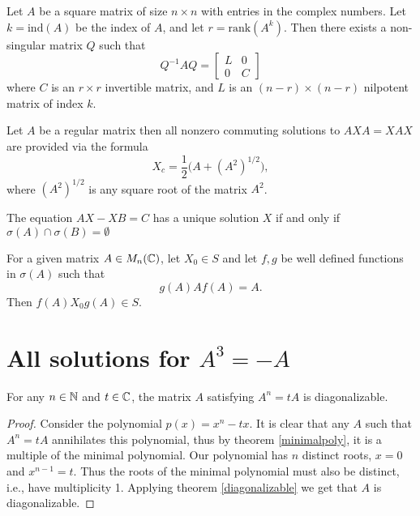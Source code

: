 \documentclass{article}
\begin{document}
\begin{theorem} \label{core-nilpotent}
Let $A$ be a square matrix of size $n \times n$ with entries in the complex numbers. Let $k = \mathrm{ind}(A)$ be the index of $A$, and let $r = \mathrm{rank}(A^k)$. Then there exists a non-singular matrix $Q$ such that
\[
Q^{-1}AQ = 
\begin{bmatrix}
    L & 0 \\
    0 & C
\end{bmatrix}
\]
where $C$ is an $r \times r$ invertible matrix, and $L$ is an $(n-r) \times (n-r)$ nilpotent matrix of index $k$.
\end{theorem}

\begin{theorem} \label{invertible}
  Let $A$ be a regular matrix then all nonzero commuting solutions to $A X A = X A X$ are provided via the formula
  \[X_c = \frac{1}{2} \bigl( A + (A^2)^{1/2} \bigl),\]
  where $(A^2)^{1/2}$ is any square root of the matrix $A^2$.
\end{theorem}

\begin{theorem} \label{Sylverster-equation}
  The equation $AX - XB = C$ has a unique solution $X$ if and only if $\sigma (A) \cap \sigma (B) = \emptyset$
\end{theorem}

\begin{theorem} \label{generating-solutions}
  For a given matrix $A \in M_n (\mathbb{C})$, let $X_0 \in S$ and let $f, g$ be well defined functions in $\sigma (A)$ such that
  \[g(A) A f(A) = A.\]
  Then $f(A) X_0 g(A) \in S$.
\end{theorem}

\section{All solutions for $A^3 = -A$}

\begin{theorem} \label{periodic-diagonal}
  For any $n \in \mathbb{N}$ and $t \in \mathbb{C}$, the matrix $A$ satisfying $A^n = t A$ is diagonalizable.
\end{theorem}

\begin{proof}
  Consider the polynomial $p(x) = x^n - t x$.
  It is clear that any $A$ such that $A^n = t A$ annihilates this polynomial, thus by theorem \ref{minimalpoly}, it is a multiple of the minimal polynomial.
  Our polynomial has $n$ distinct roots, $x = 0$ and $x^{n - 1} = t$.
  Thus the roots of the minimal polynomial must also be distinct, i.e., have multiplicity 1.
  Applying theorem \ref{diagonalizable} we get that $A$ is diagonalizable.
\end{proof}
\end{document}
